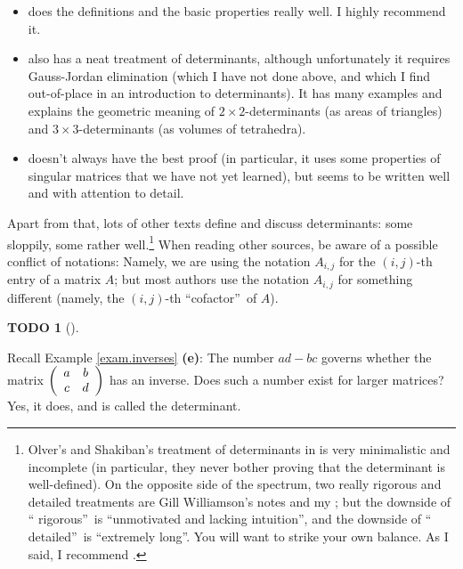 \documentclass[numbers=enddot,12pt,final,onecolumn,notitlepage]{scrartcl}%
\theoremstyle{definition}
\newtheorem{quest}[theo]{TODO}
\newenvironment{todo}[1][]
{\begin{quest}[#1]\begin{leftbar}}
{\end{leftbar}\end{quest}}
\begin{document}
\begin{itemize}
\item \cite[Chapter 8]{LaNaSc16} does the definitions and the basic properties
really well. I highly recommend it.

\item \cite[Chapter Four]{Heffer16} also has a neat treatment of determinants,
although unfortunately it requires Gauss-Jordan elimination (which I have not
done above, and which I find out-of-place in an introduction to determinants).
It has many examples and explains the geometric meaning of $2\times
2$-determinants (as areas of triangles) and $3\times3$-determinants (as
volumes of tetrahedra).

\item \cite[Chapter 4]{BarSch73} doesn't always have the best proof (in
particular, it uses some properties of singular matrices that we have not yet
learned), but seems to be written well and with attention to detail.
\end{itemize}

Apart from that, lots of other texts define and discuss determinants: some
sloppily, some rather well.\footnote{Olver's and Shakiban's treatment of
determinants in \cite[\S 1.9]{OlvSha06} is very minimalistic and incomplete
(in particular, they never bother proving that the determinant is
well-defined). On the opposite side of the spectrum, two really rigorous and
detailed treatments are Gill Williamson's notes \cite[Chapter 3]{Gill} and my
\cite{detnotes}; but the downside of \textquotedblleft
rigorous\textquotedblright\ is \textquotedblleft unmotivated and lacking
intuition\textquotedblright, and the downside of \textquotedblleft
detailed\textquotedblright\ is \textquotedblleft extremely
long\textquotedblright. You will want to strike your own balance. As I said, I
recommend \cite[Chapter 8]{LaNaSc16}.} When reading other sources, be aware of
a possible conflict of notations: Namely, we are using the notation $A_{i,j}$
for the $\left(  i,j\right)  $-th entry of a matrix $A$; but most authors use
the notation $A_{i,j}$ for something different (namely, the $\left(
i,j\right)  $-th \textquotedblleft cofactor\textquotedblright\ of $A$).

\begin{todo}
Recall Example \ref{exam.inverses} \textbf{(e)}: The number $ad-bc$ governs
whether the matrix $\left(
\begin{array}
[c]{cc}%
a & b\\
c & d
\end{array}
\right)  $ has an inverse. Does such a number exist for larger matrices? Yes,
it does, and is called the determinant.
\end{todo}
\end{document}
